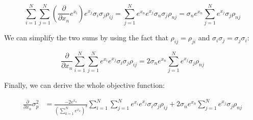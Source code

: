 \documentclass[12pt]{article}
\begin{document}
\begin{equation}
    \sum_{i=1}^{N}\sum_{j=1}^{N}( \frac{\partial}{\partial x_n} e^{x_i} ) e^{x_j}\sigma_i \sigma_j \rho_{ij} = \sum_{j=1}^{N} e^{x_n} e^{x_j}\sigma_n \sigma_j \rho_{nj} = \sigma_n e^{x_n} \sum_{j=1}^{N} e^{x_j}\sigma_j \rho_{nj}
\end{equation}

We can simplify the two sums by using the fact that $\rho_{ij} = \rho_{ji}$ and $\sigma_i \sigma_j = \sigma_j \sigma_i$:

\begin{equation}
    \frac{\partial}{\partial x_n} \sum_{i=1}^{N}\sum_{j=1}^{N} e^{x_i} e^{x_j}\sigma_i \sigma_j \rho_{ij} = 2 \sigma_n e^{x_n} \sum_{j=1}^{N} e^{x_j}\sigma_j \rho_{nj}
\end{equation}

Finally, we can derive the whole objective function:

\begin{equation}
    \begin{aligned}
        \frac{\partial}{\partial x_n} \sigma_p^2 & = \frac{-2 e^{x_n}}{(\sum_{k=1}^{N} e^{x_k})^{3}} \sum_{i=1}^{N}\sum_{j=1}^{N} e^{x_i} e^{x_j}\sigma_i \sigma_j \rho_{ij} + 2 \sigma_n e^{x_n} \sum_{j=1}^{N} e^{x_j}\sigma_j \rho_{nj} \\
    \end{aligned}
\end{equation}
\end{document}
